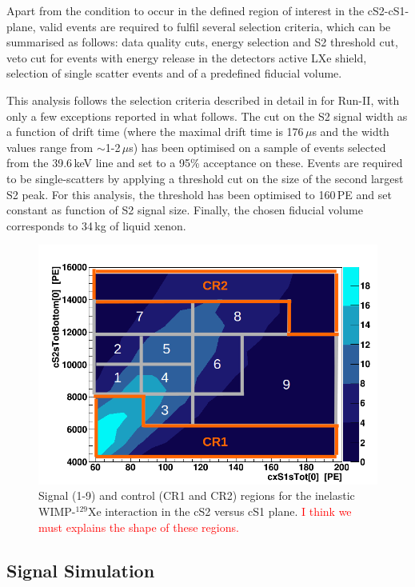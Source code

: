 Apart from the condition to occur in the defined region of interest in the cS2-cS1-plane, valid events are required to fulfil several selection criteria, 
which can be summarised as follows: data quality cuts, energy selection and S2 threshold cut, veto cut for events with energy release in the detectors active LXe shield, 
selection of single scatter events and of a predefined fiducial volume. 

This analysis follows the selection criteria described in detail in \cite{Aprile:2012vw} for Run-II, with only a few exceptions reported in what follows. 
The cut on the S2 signal width as a function of drift time (where the maximal drift time is 176\,$\mu$s and the width values range from $\sim$1-2\,$\mu$s) has been optimised on a sample of events selected from the 39.6\,keV line and set to a 95\% acceptance on these. Events are required to be single-scatters by applying a threshold cut on the size of the 
second largest S2 peak. For this analysis, the threshold has been optimised to 160\,PE and set constant as function of S2 signal size. 
Finally, the chosen fiducial volume corresponds to 34\,kg of liquid xenon.


\begin{figure}[t!]
  \includegraphics[width=\linewidth]{images/bkg_in_sr.png}
  \caption{Signal (1-9) and control (CR1 and CR2) regions for the inelastic WIMP-$^{129}$Xe interaction in the cS2 versus cS1 plane. {\textcolor{red} {I think we must explains the shape of these regions.}}}
  \label{fig:SR}
\end{figure}



\subsection{Signal Simulation} 

